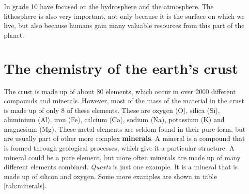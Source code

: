 

In grade 10 have focused on the hydrosphere and the atmosphere. The lithosphere is also very important, not only because it is the surface on which we live, but also because humans gain many valuable resources from this part of the planet.






\section{The chemistry of the earth's crust}

The crust is made up of about 80 elements, which occur in over 2000 different compounds and minerals. However, most of the mass of the material in the crust is made up of only 8 of these elements. These are oxygen (O), silica (Si), aluminium (Al), iron (Fe), calcium (Ca), sodium (Na), potassium (K) and magnesium (Mg). These metal elements are seldom found in their pure form, but are usually part of other more complex \textbf{minerals}. A mineral is a compound that is formed through geological processes, which give it a particular structure. A mineral could be a pure element, but more often minerals are made up of many different elements combined. \textit{Quartz} is just one example. It is a mineral that is made up of silicon and oxygen. Some more examples are shown in table \ref{tab:minerals}.


